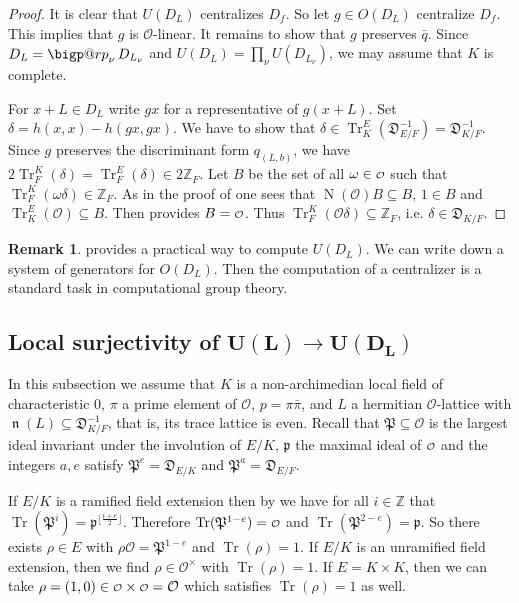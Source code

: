 \documentclass[a4paper]{amsart}
\makeatletter
\theoremstyle{definition}
\newtheorem{remark}[definition]{Remark}
\theoremstyle{plain}
\DeclareMathOperator{\Tr}{Tr}
\DeclareMathOperator{\Nr}{N}
\DeclareMathOperator{\norm}{\mathfrak{n}}
\newcommand{\ZZ}{\mathbb{Z}}
\renewcommand{\O}{\mathcal{O}}
\newcommand{\fp}{\mathfrak{p}}
\newcommand{\FP}{\mathfrak{P}}
\newcommand{\FD}{\mathfrak{D}}
\renewcommand\o{
  \mathchoice
    {{\scriptstyle\mathcal{O}}}%
    {{\scriptstyle\mathcal{O}}}%
    {{\scriptscriptstyle\mathcal{O}}}%
    {\scalebox{.7}{$\scriptscriptstyle\mathcal{O}$}}%
  }
\newcommand{\disc}[1]{{D_{#1}}}
\newcommand{\bigperp}{%
  \mathop{\mathpalette\bigp@rp\relax}%
  \displaylimits
}
\newcommand{\bigp@rp}[2]{%
  \vcenter{
    \m@th\hbox{\scalebox{\ifx#1\displaystyle2.1\else1.5\fi}{$#1\perp$}}
  }%
}
\makeatother
\begin{document}
\begin{proof}
It is clear that $U(D_L)$ centralizes $D_f$. So let $g \in O(D_L)$ centralize $D_f$. This implies that $g$ is $\O$-linear.
It remains to show that $g$ preserves $\bar q$.
Since $D_L = \bigperp_{\nu} D_{L_\nu}$ and $U(\disc{L})=\prod_{\nu}U(\disc{L_\nu})$, we may assume that $K$ is complete.

For $x + L \in D_L$ write $gx$ for a representative of $g(x+L)$.
  Set $\delta = h(x,x)-h(gx,gx)$. We have to show that $\delta \in \Tr^E_K({\FD_{E/F}^{-1}})=\FD_{K/F}^{-1}$.
Since $g$ preserves the discriminant form $q_{(L,b)}$, we have
$2\Tr^K_F(\delta)=\Tr^E_F(\delta) \in  2 \ZZ_F$.
Let $B$ be the set of all $\omega \in \o$ such that $ \Tr^K_F(\omega \delta) \in   \ZZ_F$. As in the proof of  one sees that $\Nr(\O) B \subseteq B$, $1 \in B$ and $\Tr^E_K(\O) \subseteq B$. Then  provides $B = \o$.
Thus $\Tr^K_F(\O \delta) \subseteq \ZZ_F$, i.e. $\delta \in {\FD_{K/F}}$.
\end{proof}

\begin{remark}
  provides a practical way to compute $U(D_L)$. We can write down a system of generators for $O(D_L)$. Then
 the computation of a centralizer is a standard task in computational group theory.
\end{remark}

\subsection{Local surjectivity of $\mathbf{U(L) \to U(D_L)}$}\label{subsec:localsurjectivity}
In this subsection we assume that $K$ is a non-archimedian local field of characteristic $0$, $\pi$ a prime element of $\O$, $p = \pi \bar \pi$,
and $L$ a hermitian $\O$-lattice with $\norm(L)\subseteq \FD_{K/F}^{-1}$, that is, its trace lattice is even.
Recall that $\FP\subseteq \O$ is the largest ideal invariant under the involution of $E/K$, $\fp$ the maximal ideal of $\o$ and the integers $a, e$ satisfy $\FP^e = \FD_{E/K}$ and $\FP^a = \FD_{E/F}$.

If $E/K$ is a ramified field extension then by \cite[Ch. V,\S3, Lemma 3]{Serre1979} we have for all $i \in \ZZ$ that $\Tr(\FP^i) = \fp^{\lfloor \frac{i+e}{2}\rfloor}$. Therefore $\Tr(\FP^{1-e})=\o$ and $\Tr(\FP^{2-e})=\fp$. So there exists $\rho \in E$ with $\rho \O = \FP^{1-e}$ and $\Tr(\rho)=1$. If $E/K$ is an unramified field extension, then we find $\rho \in \O^\times$ with $\Tr(\rho)=1$. If $E = K \times K$, then we can take $\rho = (1, 0) \in \o\times \o=\mathcal{O}$ which satisfies $\Tr(\rho) = 1$ as well.
\end{document}
